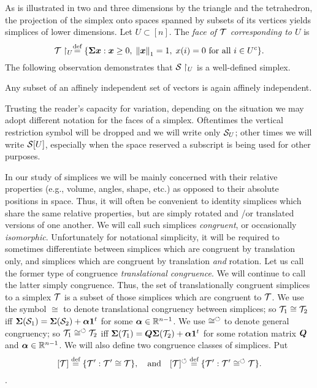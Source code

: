 As is illustrated in two and three dimensions by the triangle and the tetrahedron, the projection of the simplex onto spaces spanned by subsets of its vertices yields simplices of lower dimensions. Let $U\subset [n]$. The \emph{face of $\mathcal{T}$ corresponding to $U$} is 
\begin{equation}
\label{eq:T_U}
    \mathcal{T}\restriction_U \overset{\text{def}}{=} \{\boldsymbol{\Sigma}\vb*{x}: \vb*{x}\geq 0,\;\norm{\vb*{x}}_1=1,\;x(i)=0\text{ for all }i\in U^c\}.
\end{equation}
The following observation demonstrates that $\mathcal{S}\restriction_U$ is a well-defined simplex. 
\begin{observation}
	\label{obs:subset_affinely_independent}
	Any subset of an affinely independent set of vectors is again affinely independent. 
\end{observation}

Trusting the reader's capacity for variation, depending on the situation we may adopt different notation for the faces of a simplex. Oftentimes the vertical restriction symbol will be dropped and we will write only $\mathcal{S}_U$; other times we will write $\mathcal{S}[U]$, especially when the space reserved a subscript is being used for other purposes. 

In  our study of simplices we will be mainly concerned with their relative properties (e.g., volume, angles, shape, etc.) as opposed to their absolute  positions in space. Thus, it will often  be convenient to identity simplices which share the same relative properties, but are simply rotated and /or translated versions of one  another. We will call  such simplices \emph{congruent},  or occasionally \emph{isomorphic}. 
Unfortunately for notational simplicity, it will be  required to  sometimes differentiate between simplices  which are congruent by translation only, and simplices which are congruent by translation \emph{and} rotation. Let us  call the former type of congruence \emph{translational congruence}. We will continue to  call the latter simply congruence. Thus, the set of translationally congruent simplices to a simplex $\mathcal{T}$ is a subset of  those simplices which are congruent to $\mathcal{T}$. 
We use the symbol $\cong$ to denote translational congruency between simplices; so $\mathcal{T}_1\cong\mathcal{T}_2$ iff $\boldsymbol{\Sigma}(\mathcal{S}_1)=\boldsymbol{\Sigma}(\mathcal{S}_2) + \vb*{\alpha}\vb{1}^t$ for some $\vb*{\alpha}\in\mathbb{R}^{n-1}$. We use $\cong^\circlearrowleft$  to denote general   congruency; so  $\mathcal{T}_1\cong^\circlearrowleft\mathcal{T}_2$ iff  $\boldsymbol{\Sigma}(\mathcal{T}_1)=\vb*{Q}\boldsymbol{\Sigma}(\mathcal{T}_2) + \vb*{\alpha}\vb{1}^t$ for some rotation matrix $\vb*{Q}$  and $\vb*{\alpha}\in\mathbb{R}^{n-1}$. 
We will  also define two congruence classes of simplices. Put
\begin{equation}
\label{eq:[ssplx]}
[\mathcal{T}] \overset{\text{def}}{=} \{\mathcal{T}': \mathcal{T}'\cong\mathcal{T}\},\quad \text{and} \quad [\mathcal{T}]^\circlearrowleft\overset{\text{def}}{=} \{\mathcal{T}':\mathcal{T}'\cong^\circlearrowleft\mathcal{T}\}.
\end{equation}.

